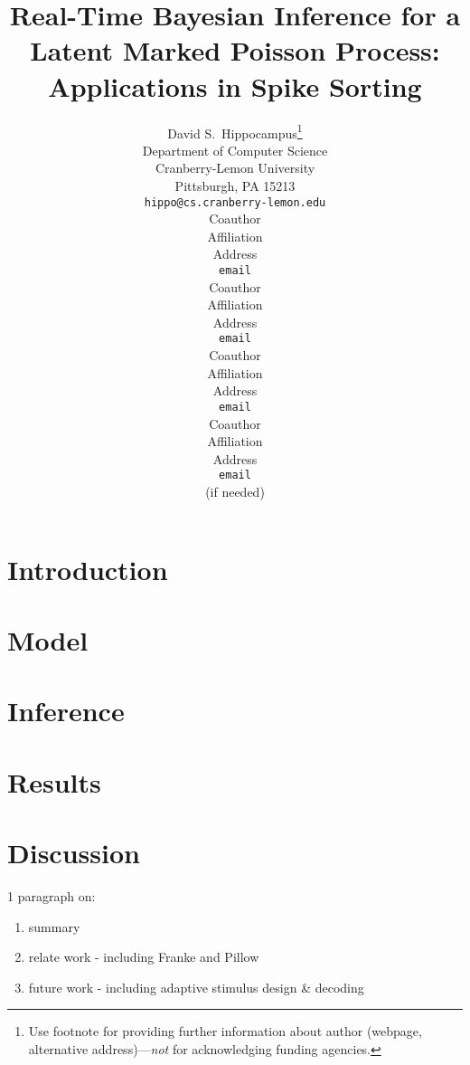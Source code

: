 \documentclass{article} %
\title{Real-Time Bayesian Inference for a Latent Marked Poisson Process: Applications in Spike Sorting}
\author{
David S.~Hippocampus\thanks{ Use footnote for providing further information
about author (webpage, alternative address)---\emph{not} for acknowledging
funding agencies.} \\
Department of Computer Science\\
Cranberry-Lemon University\\
Pittsburgh, PA 15213 \\
\texttt{hippo@cs.cranberry-lemon.edu} \\
\And
Coauthor \\
Affiliation \\
Address \\
\texttt{email} \\
\AND
Coauthor \\
Affiliation \\
Address \\
\texttt{email} \\
\And
Coauthor \\
Affiliation \\
Address \\
\texttt{email} \\
\And
Coauthor \\
Affiliation \\
Address \\
\texttt{email} \\
(if needed)\\
}
\begin{document}
\maketitle

\begin{abstract}


\end{abstract}

\section{Introduction}





\section{Model}


\section{Inference}


\section{Results}


 
\section{Discussion}

1 paragraph on:
\begin{enumerate}
	\item summary
	\item relate work - including Franke and Pillow
	\item future work - including adaptive stimulus design \& decoding
\end{enumerate}


\begin{comment}
\subsubsection*{Acknowledgments}

Use unnumbered third level headings for the acknowledgments. All
acknowledgments go at the end of the paper. Do not include 
acknowledgments in the anonymized submission, only in the 
final paper. 
\end{comment}




\end{document}
